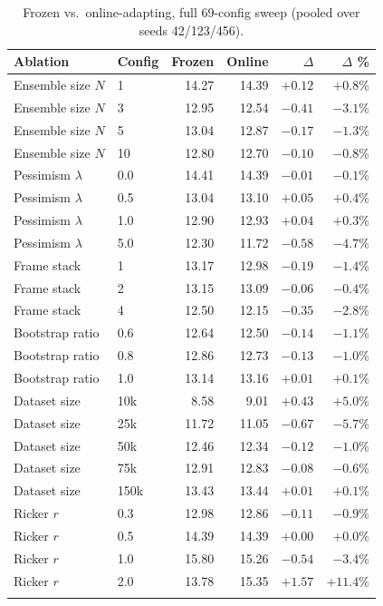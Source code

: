 \documentclass[11pt]{article}
\begin{document}
\begin{longtable}{llrrrr}
\toprule
Ablation & Config & Frozen & Online & $\Delta$ & $\Delta$ \% \\
\midrule
\endhead
Ensemble size $N$ & 1   & 14.27 & 14.39 & $+0.12$ & $+0.8\%$ \\
Ensemble size $N$ & 3   & 12.95 & 12.54 & $-0.41$ & $-3.1\%$ \\
Ensemble size $N$ & 5   & 13.04 & 12.87 & $-0.17$ & $-1.3\%$ \\
Ensemble size $N$ & 10  & 12.80 & 12.70 & $-0.10$ & $-0.8\%$ \\
Pessimism $\lambda$ & 0.0 & 14.41 & 14.39 & $-0.01$ & $-0.1\%$ \\
Pessimism $\lambda$ & 0.5 & 13.04 & 13.10 & $+0.05$ & $+0.4\%$ \\
Pessimism $\lambda$ & 1.0 & 12.90 & 12.93 & $+0.04$ & $+0.3\%$ \\
Pessimism $\lambda$ & 5.0 & 12.30 & 11.72 & $-0.58$ & $-4.7\%$ \\
Frame stack & 1 & 13.17 & 12.98 & $-0.19$ & $-1.4\%$ \\
Frame stack & 2 & 13.15 & 13.09 & $-0.06$ & $-0.4\%$ \\
Frame stack & 4 & 12.50 & 12.15 & $-0.35$ & $-2.8\%$ \\
Bootstrap ratio & 0.6 & 12.64 & 12.50 & $-0.14$ & $-1.1\%$ \\
Bootstrap ratio & 0.8 & 12.86 & 12.73 & $-0.13$ & $-1.0\%$ \\
Bootstrap ratio & 1.0 & 13.14 & 13.16 & $+0.01$ & $+0.1\%$ \\
Dataset size & 10k  & 8.58  & 9.01  & $\mathbf{+0.43}$ & $\mathbf{+5.0\%}$ \\
Dataset size & 25k  & 11.72 & 11.05 & $-0.67$ & $-5.7\%$ \\
Dataset size & 50k  & 12.46 & 12.34 & $-0.12$ & $-1.0\%$ \\
Dataset size & 75k  & 12.91 & 12.83 & $-0.08$ & $-0.6\%$ \\
Dataset size & 150k & 13.43 & 13.44 & $+0.01$ & $+0.1\%$ \\
Ricker $r$ & 0.3 & 12.98 & 12.86 & $-0.11$ & $-0.9\%$ \\
Ricker $r$ & 0.5 & 14.39 & 14.39 & $+0.00$ & $+0.0\%$ \\
Ricker $r$ & 1.0 & 15.80 & 15.26 & $-0.54$ & $-3.4\%$ \\
Ricker $r$ & 2.0 & 13.78 & 15.35 & $\mathbf{+1.57}$ & $\mathbf{+11.4\%}$ \\
\bottomrule
\caption{Frozen vs.\ online-adapting, full 69-config sweep
(pooled over seeds 42/123/456).}
\end{longtable}
\end{document}
